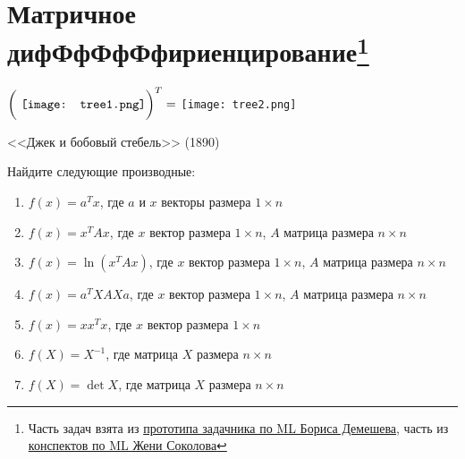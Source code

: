 
\section{Матричное дифФфФфФфириенцирование\footnote{Часть задач взята из \href{https://github.com/bdemeshev/mlearn\_pro/blob/master/mlearn\_pro.pdf}{прототипа задачника по ML  Бориса Демешева}, часть из \href{https://github.com/esokolov/ml-course-msu}{конспектов по ML Жени Соколова} } }

\epigraph{ $\bigg(\text{ \texttt{[image: tree1.png]}} \bigg)^T = $  \texttt{[image: tree2.png]} }{<<Джек и бобовый стебель>> (1890)}


\begin{problem}{}	
	Найдите следующие производные:
	\begin{enumerate}	
		
		\item $f(x) = a^T x$, где  $a$  и $x$ векторы размера $1 \times n$ 
		
		\item $f(x) = x^T A x$, где $x$ вектор размера $1 \times n$, $A$ матрица размера $n \times n$
		
		\item $f(x) = \ln(x^T A x)$, где $x$ вектор размера $1 \times n$, $A$ матрица размера $n \times n$
		
		\item $f(x) = a^TXAXa$, где $x$ вектор размера $1 \times n$, $A$ матрица размера $n \times n$
		
		\item $f(x) = x x^T x$,  где $x$ вектор размера $1 \times n$
		
		\item $f(X) = X^{-1}$, где матрица $X$ размера $n \times n$
		
		\item  $f(X) = \det X$, где матрица $X$ размера $n \times n$
	\end{enumerate}
\end{problem} 


